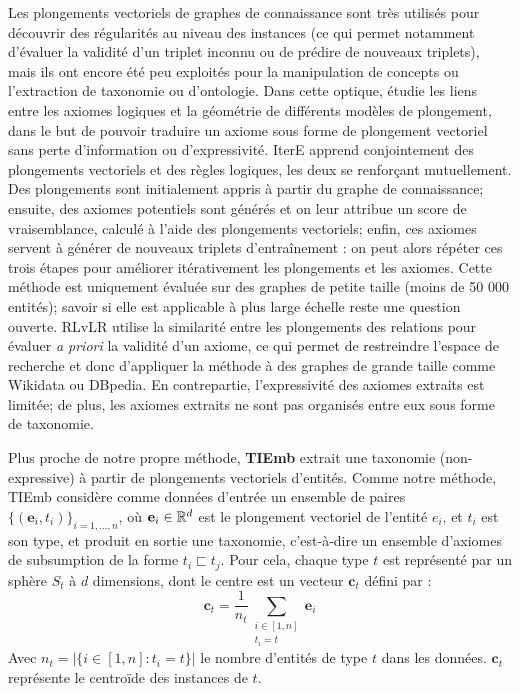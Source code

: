 Les plongements vectoriels de graphes de connaissance sont très utilisés pour découvrir des régularités au niveau des instances (ce qui permet notamment d'évaluer la validité d'un triplet inconnu ou de prédire de nouveaux triplets), mais ils ont encore été peu exploités pour la manipulation de concepts ou l'extraction de taxonomie ou d'ontologie. Dans cette optique, \cite{gutierrez2018knowledge} étudie les liens entre les axiomes logiques et la géométrie de différents modèles de plongement, dans le but de pouvoir traduire un axiome sous forme de plongement vectoriel sans perte d'information ou d'expressivité. IterE \cite{zhang2019iteratively} apprend conjointement des plongements vectoriels et des règles logiques, les deux se renforçant mutuellement. Des plongements sont initialement appris à partir du graphe de connaissance; ensuite, des axiomes potentiels sont générés et on leur attribue un score de vraisemblance, calculé à l'aide des plongements vectoriels; enfin, ces axiomes servent à générer de nouveaux triplets d'entraînement : on peut alors répéter ces trois étapes pour améliorer itérativement les plongements et les axiomes. Cette méthode est uniquement évaluée sur des graphes de petite taille (moins de 50 000 entités); savoir si elle est applicable à plus large échelle reste une question ouverte. RLvLR \cite{omran2018scalable} utilise la similarité entre les plongements des relations pour évaluer \textit{a priori} la validité d'un axiome, ce qui permet de restreindre l'espace de recherche et donc d'appliquer la méthode à des graphes de grande taille comme Wikidata ou DBpedia. En contrepartie, l'expressivité des axiomes extraits est limitée; de plus, les axiomes extraits ne sont pas organisés entre eux sous forme de taxonomie.


\label{subsec:litt-tiemb}


Plus proche de notre propre méthode, \textbf{TIEmb} \cite{ristoski2017large} extrait une taxonomie (non-expressive) à partir de plongements vectoriels d'entités. Comme notre méthode, TIEmb considère comme données d'entrée un ensemble de paires $\{(\textbf{e}_i, t_i) \}_{i=1, \ldots, n}$, où $\textbf{e}_i \in \mathbb{R}^d$ est le plongement vectoriel de l'entité $e_i$, et $t_i$ est son type, et produit en sortie une taxonomie, c'est-à-dire un ensemble d'axiomes de subsumption de la forme $t_i \sqsubset t_j$. Pour cela, chaque type $t$ est représenté par un sphère $S_t$ à $d$ dimensions, dont le centre est un vecteur $\textbf{c}_t$ défini par :
\begin{equation}
 \textbf{c}_t = \frac{1}{n_t} \sum_{\substack{i \in [1, n] \\ t_i = t}} \textbf{e}_i
\end{equation}
Avec $n_t = |\{ i \in [1, n] : t_i = t \}|$ le nombre d'entités de type $t$ dans les données. $\textbf{c}_t$ représente le centroïde des instances de $t$.

